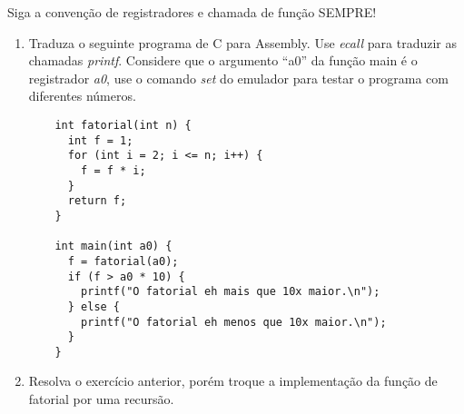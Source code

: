 \documentclass{article}
\begin{document}
Siga a convenção de registradores e chamada de função SEMPRE!

\begin{enumerate}
  \item Traduza o seguinte programa de C para Assembly. Use \textit{ecall} para
  traduzir as chamadas \textit{printf}. Considere que o argumento ``a0'' da
  função main é o registrador \textit{a0}, use o comando \textit{set} do
  emulador para testar o programa com diferentes números.

  \begin{verbatim}
    int fatorial(int n) {
      int f = 1;
      for (int i = 2; i <= n; i++) {
        f = f * i;
      }
      return f;
    }

    int main(int a0) {
      f = fatorial(a0);
      if (f > a0 * 10) {
        printf("O fatorial eh mais que 10x maior.\n");
      } else {
        printf("O fatorial eh menos que 10x maior.\n");
      }
    }
  \end{verbatim}

  \item Resolva o exercício anterior, porém troque a implementação da função de
  fatorial por uma recursão.
\end{enumerate}
\end{document}
